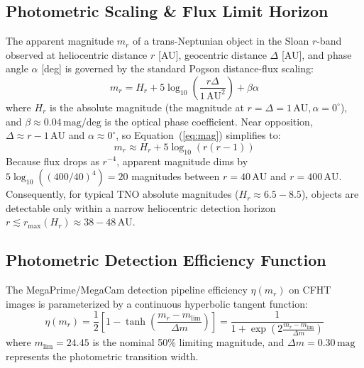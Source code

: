 \documentclass[11pt,a4paper]{article}
\begin{document}
\subsection{Photometric Scaling \& Flux Limit Horizon}
The apparent magnitude $m_r$ of a trans-Neptunian object in the Sloan $r$-band observed at heliocentric distance $r$ [AU], geocentric distance $\Delta$ [AU], and phase angle $\alpha$ [deg] is governed by the standard Pogson distance-flux scaling:
\begin{equation}
m_r = H_r + 5 \log_{10}\left(\frac{r \Delta}{1\,\text{AU}^2}\right) + \beta \alpha
\label{eq:mag}
\end{equation}
where $H_r$ is the absolute magnitude (the magnitude at $r = \Delta = 1\,\text{AU}, \alpha = 0^\circ$), and $\beta \approx 0.04\,\text{mag/deg}$ is the optical phase coefficient. Near opposition, $\Delta \approx r - 1\,\text{AU}$ and $\alpha \approx 0^\circ$, so Equation~(\ref{eq:mag}) simplifies to:
\begin{equation}
m_r \approx H_r + 5 \log_{10}(r(r - 1))
\label{eq:mag_opp}
\end{equation}
Because flux drops as $r^{-4}$, apparent magnitude dims by $5 \log_{10}((400/40)^4) = 20$ magnitudes between $r = 40\,\text{AU}$ and $r = 400\,\text{AU}$. Consequently, for typical TNO absolute magnitudes ($H_r \approx 6.5 - 8.5$), objects are detectable only within a narrow heliocentric detection horizon $r \lesssim r_{\text{max}}(H_r) \approx 38 - 48\,\text{AU}$.

\subsection{Photometric Detection Efficiency Function}
The MegaPrime/MegaCam detection pipeline efficiency $\eta(m_r)$ on CFHT images is parameterized by a continuous hyperbolic tangent function:
\begin{equation}
\eta(m_r) = \frac{1}{2} \left[ 1 - \tanh\left( \frac{m_r - m_{\text{lim}}}{\Delta m} \right) \right] = \frac{1}{1 + \exp\left( 2 \frac{m_r - m_{\text{lim}}}{\Delta m} \right)}
\label{eq:eta}
\end{equation}
where $m_{\text{lim}} = 24.45$ is the nominal 50\% limiting magnitude, and $\Delta m = 0.30\,\text{mag}$ represents the photometric transition width.
\end{document}
